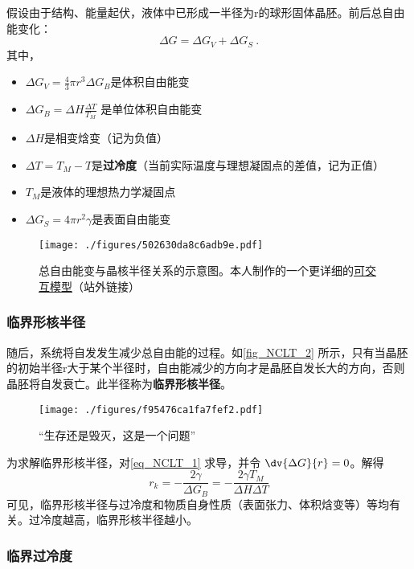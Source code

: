 假设由于结构、能量起伏，液体中已形成一半径为r的球形固体晶胚。前后总自由能变化： 
\begin{equation}\label{eq_NCLT_1}
\Delta G  = \Delta G_V +\Delta G_S~.
\end{equation}
其中，
\begin{itemize}
\item $\Delta G_V = \frac{4}{3}\pi r^3 \Delta G_B$是体积自由能变
\item $\Delta G_B = \Delta H \frac{\Delta T}{T_M}$ 是单位体积自由能变
\item $\Delta H$是相变焓变（记为负值）
\item $\Delta T=T_M-T$是\textbf{过冷度}（当前实际温度与理想凝固点的差值，记为正值）
\item $T_M$是液体的理想热力学凝固点
\item $\Delta G_S = 4\pi r^2 \gamma$是表面自由能变
\end{itemize}

\begin{figure}[ht]
\centering
\texttt{[image: ./figures/502630da8c6adb9e.pdf]}
\caption{总自由能变与晶核半径关系的示意图。本人制作的一个更详细的\href{https://www.geogebra.org/m/prktxhhk}{可交互模型}（站外链接）} \label{fig_NCLT_2}
\end{figure}

\subsubsection{临界形核半径}
随后，系统将自发发生减少总自由能的过程。如\autoref{fig_NCLT_2} 所示，只有当晶胚的初始半径r大于某个半径时，自由能减少的方向才是晶胚自发长大的方向，否则晶胚将自发衰亡。此半径称为\textbf{临界形核半径}。
\begin{figure}[ht]
\centering
\texttt{[image: ./figures/f95476ca1fa7fef2.pdf]}
\caption{“生存还是毁灭，这是一个问题”} \label{fig_NCLT_3}
\end{figure}

为求解临界形核半径，对\autoref{eq_NCLT_1} 求导，并令 $\dv{\Delta G}{r} = 0$。解得
\begin{equation}
r_k=-\frac{2\gamma}{\Delta G_B}=-\frac{2\gamma T_M}{\Delta H \Delta T}
\end{equation}
可见，临界形核半径与过冷度和物质自身性质（表面张力、体积焓变等）等均有关。过冷度越高，临界形核半径越小。

\subsubsection{临界过冷度}

